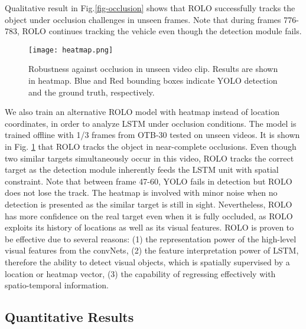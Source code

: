 \documentclass{article}
\begin{document}
Qualitative result in Fig.\ref{fig-occlusion} shows that ROLO successfully tracks the object under occlusion challenges in unseen frames. Note that during frames 776-783, ROLO continues tracking the vehicle even though the detection module fails. 
\begin{figure}[h] %
	\centering
	\captionsetup{justification=centering}
	\texttt{[image: heatmap.png]}
	\caption{Robustness against occlusion in unseen video clip. Results are shown in heatmap. Blue and Red bounding boxes indicate YOLO detection and the ground truth, respectively.}
	\label{fig-occlusion-heatmap}
\end{figure}
We also train an alternative ROLO model with heatmap instead of location coordinates, in order to analyze LSTM under occlusion conditions. The model is trained offline with 1/3 frames from OTB-30 tested on unseen videos. 
It is shown in Fig. \ref{fig-occlusion-heatmap} that ROLO tracks the object in near-complete occlusions.  
Even though two similar targets simultaneously occur in this video, ROLO tracks the correct target as the detection module inherently feeds the LSTM unit with spatial constraint.
Note that between frame 47-60, YOLO fails in detection but ROLO does not lose the track. 
The heatmap is involved with minor noise when no detection is presented as the similar target is still in sight. Nevertheless, ROLO has more confidence on the real target even when it is fully occluded, 
as ROLO exploits its history of locations as well as its visual features.  
ROLO is proven to be effective due to several reasons: (1) the representation power of the high-level visual features from the convNets, (2) the feature interpretation power of LSTM, therefore the ability to detect visual objects, which is spatially supervised by a location or heatmap vector, (3) the capability of regressing effectively with spatio-temporal information.


\subsection{Quantitative Results}
\end{document}
